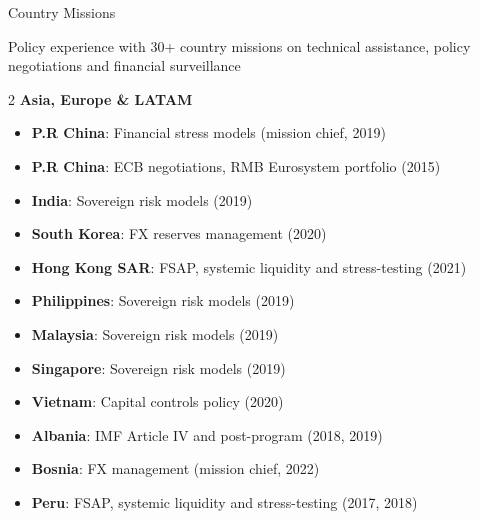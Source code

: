 \documentclass[usegeometry, 10pt, a4paper]{cv} %
\begin{document}
\begin{rubriquetableau}[0.95\textwidth]{Country Missions}

Policy experience with 30+ country missions on technical assistance, policy negotiations and financial surveillance\\

\begin{multicols}{2}
  \textbf{\large Asia, Europe \& LATAM}
\begin{itemize}
  \item \textbf{P.R China}: Financial stress models (mission chief, 2019) 
  \item \textbf{P.R China}: ECB negotiations, RMB Eurosystem portfolio (2015)
  \item \textbf{India}: Sovereign risk models (2019)
  \item \textbf{South Korea}: FX reserves management (2020)
  \item \textbf{Hong Kong SAR}: FSAP, systemic liquidity and stress-testing (2021)
  \item \textbf{Philippines}: Sovereign risk models (2019)
  \item \textbf{Malaysia}: Sovereign risk models (2019)
  \item \textbf{Singapore}: Sovereign risk models (2019)
  \item \textbf{Vietnam}: Capital controls policy (2020)
  \item \textbf{Albania}: IMF Article IV and post-program (2018, 2019)
  \item \textbf{Bosnia}: FX management (mission chief, 2022)
  \item \textbf{Peru}: FSAP, systemic liquidity and stress-testing (2017, 2018)
\end{itemize}


\end{multicols}
\end{rubriquetableau}
\end{document}
